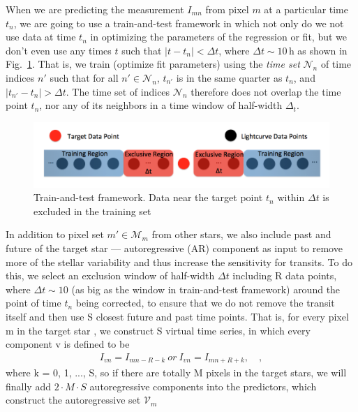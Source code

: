 \documentclass[12pt, preprint]{aastex}
\newcommand{\set}[1]{\mathcal{#1}}
\begin{document}
When we are predicting the measurement $I_{mn}$ from pixel $m$ at a particular time $t_n$,
  we are going to use a train-and-test framework in which not only do we not use
  data at time $t_n$ in optimizing the parameters of the regression or fit,
  but we don't even use any times $t$ such that $|t-t_n| < \Delta t$,
  where $\Delta t\sim 10$\,h as shown in Fig.~\ref{train-and-test}.
That is, we train (optimize fit parameters) using the \emph{time set} $\set{N}_n$ of time
  indices $n'$ such that for all $n'\in\set{N}_n$,
  $t_{n'}$ is in the same quarter as $t_n$,
  and $|t_{n'} - t_n|>\Delta t$.
The time set of indices $\set{N}_n$ therefore does not overlap the time point $t_n$,
  nor any of its neighbors in a time window of half-width $\Delta_t$. 
  
\begin{figure}[htb]
\centering
\includegraphics[width=0.8\columnwidth]{train_and_test}
\caption{\label{train-and-test} Train-and-test framework. Data near the target point $t_{n}$ within $\Delta t$ is excluded in the training set}
\end{figure}

In addition to pixel set $m'\in\set{M}_m$ from other stars,  we also include
past and future of the target star --- autoregressive (AR) component as input to remove 
more of the stellar variability and thus increase the sensitivity for transits. To do this, 
we select an exclusion window of half-width $\Delta t$ including R data points, 
where $\Delta t\sim 10$ (as big 
as the window in train-and-test framework) around the point of time $t_{n}$ being 
corrected, to ensure that we do not remove the transit itself and then use S closest 
future and past time points. That is, for every pixel m in the target star , we construct S virtual time series, in which every component v is defined to be     
\begin{eqnarray}
I_{vn} = I_{mn-R-k}\ or\ I_{vn} = I_{mn+R+k},
\quad,
\end{eqnarray}
where k = 0, 1, ..., S, so if there are totally M pixels in the target stars, we will finally add 
$2\cdot M\cdot S$ autoregressive components into the predictors,  which construct the autoregressive set $\set{V}_m$
\end{document}
